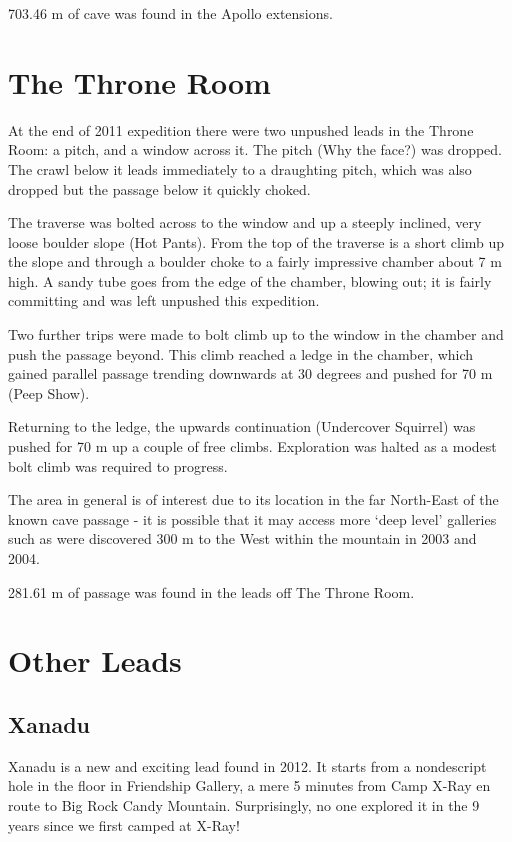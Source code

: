703.46 m of cave was found in the Apollo extensions.

\section{The Throne Room}\label{the-throne-room}

At the end of 2011 expedition there were two unpushed leads in the
Throne Room: a pitch, and a window across it. The pitch (Why the face?)
was dropped. The crawl below it leads immediately to a draughting pitch,
which was also dropped but the passage below it quickly choked.

The traverse was bolted across to the window and up a steeply inclined,
very loose boulder slope (Hot Pants). From the top of the traverse is a
short climb up the slope and through a boulder choke to a fairly
impressive chamber about 7 m high. A sandy tube goes from the edge of
the chamber, blowing out; it is fairly committing and was left unpushed
this expedition.

Two further trips were made to bolt climb up to the window in the
chamber and push the passage beyond. This climb reached a ledge in the
chamber, which gained parallel passage trending downwards at 30 degrees
and pushed for 70 m (Peep Show).

Returning to the ledge, the upwards continuation (Undercover Squirrel)
was pushed for 70 m up a couple of free climbs. Exploration was halted
as a modest bolt climb was required to progress.

The area in general is of interest due to its location in the far
North-East of the known cave passage - it is possible that it may access
more `deep level' galleries such as were discovered 300 m to the West
within the mountain in 2003 and 2004.

281.61 m of passage was found in the leads off The Throne Room.

\section{Other Leads}\label{other-leads-1}

\subsection{Xanadu}\label{xanadu}

Xanadu is a new and exciting lead found in 2012. It starts from a
nondescript hole in the floor in Friendship Gallery, a mere 5 minutes
from Camp X-Ray en route to Big Rock Candy Mountain. Surprisingly, no
one explored it in the 9 years since we first camped at X-Ray!

